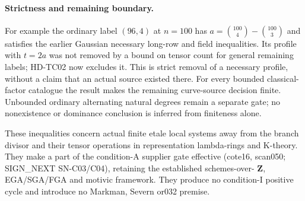 \paragraph{Strictness and remaining boundary.}
For example the ordinary label $(96,4)$ at $n=100$ has
$a=\binom{100}{4}-\binom{100}{3}$ and satisfies the earlier
Gaussian necessary long-row and field inequalities.
Its profile with $t=2a$ was not removed by a bound on tensor
count for general remaining labels; HD-TC02 now excludes it.
This is strict removal of a necessary profile, without a
claim that an actual source existed there.
For every bounded classical-factor catalogue the result
makes the remaining curve-source decision finite. Unbounded
ordinary alternating natural degrees remain a separate gate;
no nonexistence or dominance conclusion is inferred from
finiteness alone.

These inequalities concern actual finite etale local systems
away from the branch divisor and their tensor operations in
representation lambda-rings and K-theory. They make a part of
the condition-A supplier gate effective (cote16, scan050;
SIGN\_NEXT SN-C03/C04), retaining the established schemes-over-
$\mathbf Z$, EGA/SGA/FGA and motivic framework. They produce
no condition-I positive cycle and introduce no Markman,
Severn or032 premise.
